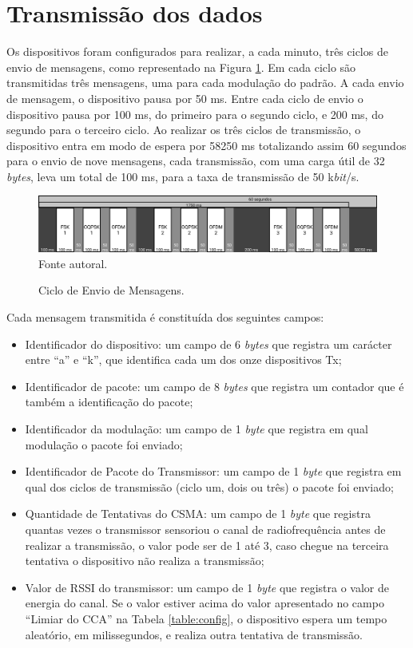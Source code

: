 \section{Transmissão dos dados}
Os dispositivos foram configurados para realizar, a cada minuto, três ciclos de envio de mensagens, como representado na Figura \ref{fig:ciclo_envio}. Em cada ciclo são transmitidas três mensagens, uma para cada modulação do padrão. A cada envio de mensagem, o dispositivo pausa por 50 ms. Entre cada ciclo de envio o dispositivo pausa por 100 ms, do primeiro para o segundo ciclo, e 200 ms, do segundo para o terceiro ciclo. Ao realizar os três ciclos de transmissão, o dispositivo entra em modo de espera por 58250 ms totalizando assim 60 segundos para o envio de nove mensagens, cada transmissão, com uma carga útil de 32 \emph{bytes}, leva um total de 100 ms, para a taxa de transmissão de 50 k\emph{bit}/s.

\begin{figure}[h]
  \centering
  \caption{Ciclo de Envio de Mensagens.}
  \includegraphics[width=\textwidth]{./sections/textual/chapters/images/metodo_ciclo_envio.png}\\
  Fonte autoral.
  \label{fig:ciclo_envio}
\end{figure}

Cada mensagem transmitida é constituída dos seguintes campos:
\begin{itemize}
  \label{table:estruturaTx}
  \item Identificador do dispositivo: um campo de 6 \emph{bytes} que registra um carácter entre ``a'' e ``k'', que identifica cada um dos onze dispositivos Tx;
  \item Identificador de pacote: um campo de 8 \emph{bytes} que registra um contador que é também a identificação do pacote;
  \item Identificador da modulação: um campo de 1 \emph{byte} que registra em qual modulação o pacote foi enviado;
  \item Identificador de Pacote do Transmissor: um campo de 1 \emph{byte} que registra em qual dos ciclos de transmissão (ciclo um, dois ou três) o pacote foi enviado;
  \item Quantidade de Tentativas do CSMA: um campo de 1 \emph{byte} que registra quantas vezes o transmissor sensoriou o canal de radiofrequência antes de realizar a transmissão, o valor pode ser de 1 até 3, caso chegue na terceira tentativa o dispositivo não realiza a transmissão;
  \item Valor de RSSI do transmissor: um campo de 1 \emph{byte} que registra o valor de energia do canal. Se o valor estiver acima do valor apresentado no campo ``Limiar do CCA'' na Tabela \ref{table:config}, o dispositivo espera um tempo aleatório, em milissegundos, e realiza outra tentativa de transmissão.
\end{itemize}

